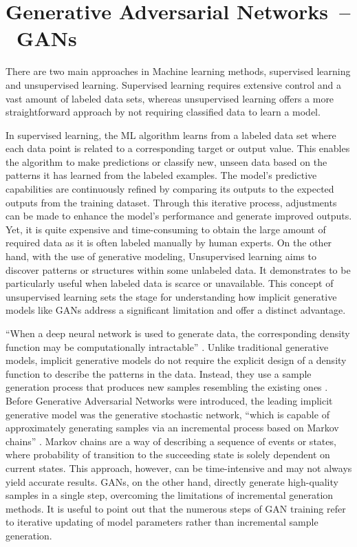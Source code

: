 \section{Generative Adversarial Networks~--~GANs}\label{GAN}

There are two main approaches in Machine learning methods, 
supervised learning and unsupervised learning. Supervised learning requires extensive control and a vast amount of labeled data sets, whereas unsupervised learning offers a more straightforward approach by not requiring classified data to learn a model.

In supervised learning, the ML algorithm learns from a labeled data set where each data point is related to a corresponding target or output value. This enables the algorithm to make predictions or classify new, unseen data based on the patterns it has learned from the labeled examples. The model's predictive capabilities are continuously refined by comparing its outputs to the expected outputs from the training dataset. Through this iterative process, adjustments can be made to enhance the model's performance and generate improved outputs. Yet, it is quite expensive and time-consuming to obtain the large amount of required data as it is often labeled manually by human experts. On the other hand, with the use of generative modeling, Unsupervised learning aims to discover patterns or structures within some unlabeled data. It demonstrates to be particularly useful when labeled data is scarce or unavailable. This concept of unsupervised learning sets the stage for understanding how implicit generative models like GANs address a significant limitation and offer a distinct advantage.

``When a deep neural network is used to generate data, the corresponding density function may be computationally intractable'' \citep{goodfellowGAN}. Unlike traditional generative models, implicit generative models do not require the explicit design of a density function to describe the patterns in the data. Instead, they use a sample generation process that produces new samples resembling the existing ones \citep{goodfellowGAN}. Before Generative Adversarial Networks were introduced, the leading implicit generative model was the generative stochastic network, ``which is capable of approximately generating samples via an incremental process based on Markov chains'' \citep{goodfellowGAN}. Markov chains are a way of describing a sequence of events or states, where probability of transition to the succeeding state is solely dependent on current states. This approach, however,  can be time-intensive and may not always yield accurate results. GANs, on the other hand, directly generate high-quality samples in a single step, overcoming the limitations of incremental generation methods. It is useful to point out that the numerous steps of GAN training refer to iterative updating of model parameters rather than incremental sample generation.

